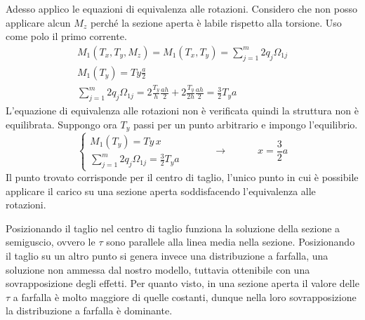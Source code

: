 \begin{esempioBox}
Adesso applico le equazioni di equivalenza alle rotazioni. Considero che non posso applicare alcun $M_z$ perché la sezione aperta è labile rispetto alla torsione. Uso come polo il primo corrente.
\begin{align*}
    M_1 (T_x, T_y, M_z)=  M_1 (T_x, T_y) = \sum^m_{j=1}2q_j\Omega_{1j}\\
    M_1(T_y)=Ty\frac{a}{2}\\
    \sum^m_{j=1}2q_j\Omega_{1j} = 2\frac{T_y}{h} \frac{ah}{2} +2\frac{T_y}{2h} \frac{ah}{2} = \frac{3}{2}T_ya
\end{align*}
L'equazione di equivalenza alle rotazioni non è verificata quindi la struttura non è equilibrata. Suppongo ora $T_y$ passi per un punto arbitrario e impongo l'equilibrio.
\begin{equation*}
\begin{cases}
     M_1(T_y)=Ty\,x\\
    \sum^m_{j=1}2q_j\Omega_{1j} = \frac{3}{2}T_ya
\end{cases}
\quad\quad\quad\rightarrow\quad\quad\quad
   x=\frac{3}{2}a
\end{equation*}
Il punto trovato corrisponde per il centro di taglio, l'unico punto in cui è possibile applicare il carico su una sezione aperta soddisfacendo l'equivalenza alle rotazioni.

\end{esempioBox}


Posizionando il taglio nel centro di taglio funziona la soluzione della sezione a semiguscio, ovvero le $\tau$ sono parallele alla linea media nella sezione. Posizionando il taglio su un altro punto si genera invece una distribuzione a farfalla, una soluzione non ammessa dal nostro modello, tuttavia ottenibile con una sovrapposizione degli effetti. Per quanto visto, in una sezione aperta il valore delle $\tau$ a farfalla è molto maggiore di quelle costanti, dunque nella loro sovrapposizione la distribuzione a farfalla è dominante.